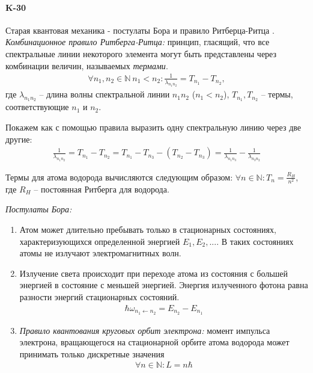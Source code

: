 \documentclass[__main__.tex]{subfiles}
\begin{document}
\paragraph{K-30}
Старая квантовая механика - постулаты Бора и правило Ритберца-Ритца	.\\

\textit{Комбинационное правило Ритберга-Ритца:} принцип, гласящий, что все спектральные линии некоторого элемента могут быть представлены через комбинации величин, называемых \textit{термами}.
\begin{gather*}
	\forall n_1,n_2\in\mathbb{N} \ n_1 < n_2 \colon \frac{1}{\lambda_{n_1 n_2}} = T_{n_1} - T_{n_2},
\end{gather*}
где $\lambda_{n_1 n_2}$ -- длина волны спектральной линии $n_1 n_2$ ($n_1<n_2$), $T_{n_1}, T_{n_2}$ -- термы, соответствующие $n_1$ и $n_2$.

Покажем как с помощью правила выразить одну спектральную линию через две другие:
\begin{gather*}
	\frac{1}{\lambda_{n_1 n_2}}
	=
	T_{n_1} - T_{n_2}
	=
	T_{n_1}-T_{n_3} - (T_{n_2}-T_{n_3})
	=
	\frac{1}{\lambda_{n_1 n_3}} - \frac{1}{\lambda_{n_3 n_2}}
\end{gather*}

Термы для атома водорода вычисляются следующим образом:
$
\forall n\in\mathbb{N}\colon T_n = \frac{R_H}{n^2},
$
где $R_H$ -- постоянная Ритберга для водорода.


\textit{Постулаты Бора:}
\begin{enumerate}
	\item Атом может длительно пребывать только в стационарных состояниях, характеризующихся определенной энергией $E_1,E_2,...$. В таких состояниях атомы не излучают электромагнитных волн.
	\item Излучение света происходит при переходе атома из состояния с большей энергией в состояние с меньшей энергией. Энергия излученного фотона равна разности энергий стационарных состояний.
	\begin{gather*}
		\hbar\omega_{n_1 \leftarrow n_2} = E_{n_2} - E_{n_1}
	\end{gather*}
	\item \textit{Правило квантования круговых орбит электрона:} момент импульса электрона, вращающегося на стационарной орбите атома водорода может принимать только дискретные значения
	\begin{gather*}
		\forall n\in\mathbb{N}\colon L = n\hbar
	\end{gather*}
\end{enumerate}
\end{document}
